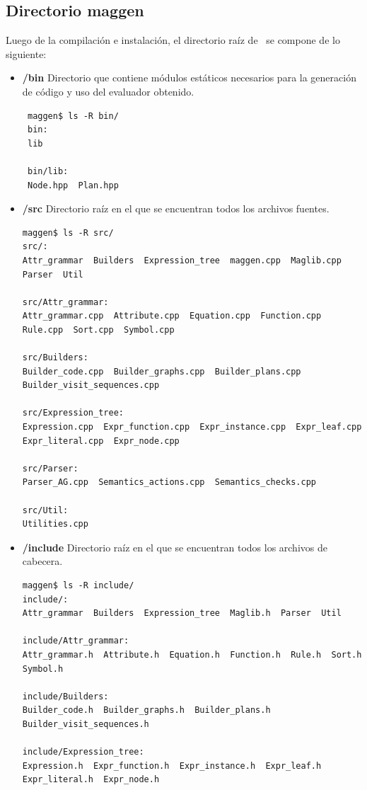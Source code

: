 \subsection*{Directorio {\sf maggen}}
Luego de la compilación e instalación, el directorio raíz de \maggen\ se compone de lo siguiente:
\begin{itemize}
\item \textbf{/bin} Directorio que contiene módulos estáticos necesarios para la generación de código y uso del evaluador obtenido.
{\footnotesize \begin{verbatim}
 maggen$ ls -R bin/
 bin:
 lib

 bin/lib:
 Node.hpp  Plan.hpp
\end{verbatim} }
 
\item \textbf{/src} Directorio raíz en el que se encuentran todos los archivos fuentes.
{\footnotesize \begin{verbatim}
maggen$ ls -R src/ 
src/:
Attr_grammar  Builders  Expression_tree  maggen.cpp  Maglib.cpp  Parser  Util

src/Attr_grammar:
Attr_grammar.cpp  Attribute.cpp  Equation.cpp  Function.cpp  Rule.cpp  Sort.cpp  Symbol.cpp

src/Builders:
Builder_code.cpp  Builder_graphs.cpp  Builder_plans.cpp  Builder_visit_sequences.cpp

src/Expression_tree:
Expression.cpp  Expr_function.cpp  Expr_instance.cpp  Expr_leaf.cpp  Expr_literal.cpp  Expr_node.cpp

src/Parser:
Parser_AG.cpp  Semantics_actions.cpp  Semantics_checks.cpp

src/Util:
Utilities.cpp
\end{verbatim} }

\item \textbf{/include} Directorio raíz en el que se encuentran todos los archivos de cabecera.

{\footnotesize \begin{verbatim}
maggen$ ls -R include/
include/:
Attr_grammar  Builders  Expression_tree  Maglib.h  Parser  Util

include/Attr_grammar:
Attr_grammar.h  Attribute.h  Equation.h  Function.h  Rule.h  Sort.h  Symbol.h

include/Builders:
Builder_code.h  Builder_graphs.h  Builder_plans.h  Builder_visit_sequences.h

include/Expression_tree:
Expression.h  Expr_function.h  Expr_instance.h  Expr_leaf.h  Expr_literal.h  Expr_node.h


\end{verbatim}}
\end{itemize}
